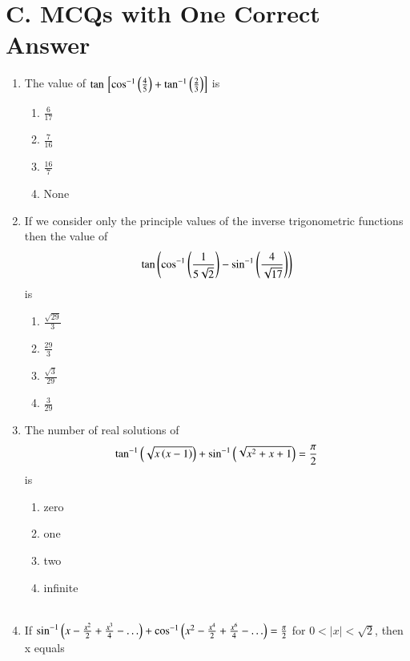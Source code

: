 \documentclass[journal,12pt,twocolumn,article]{IEEEtran}
\theoremstyle{remark}
\begin{document}
\section*{C. MCQs with One Correct Answer}
\begin{enumerate}
	\item The value of $\tan {}\left[ \cos ^{-1}\left(\frac{4}{5}\right)+\tan^{-1}\left(\frac{2}{3}\right) \right]$ is
\hfill {}
\begin{multicols}{2}
\begin{enumerate}
\item $\frac{6}{17}$
\item $\frac{7}{16}$
\columnbreak
\item $\frac{16}{7}$
\item None
\end{enumerate}
\end{multicols}
\item If we consider only the principle values of the inverse trigonometric functions then the value of 
$$\tan \left(\cos ^{-1}\left(\frac{1}{5\sqrt{2}}\right)-\sin ^{-1}\left(\frac{4}{\sqrt{17}}\right)\right)$$ is
\hfill {}
\begin{multicols}{2}
\begin{enumerate}
\item $\frac{\sqrt{29}}{3}$ 
\item $\frac{29}{3}$
\columnbreak
\item $\frac{\sqrt{3}}{29}$ 
\item $\frac{3}{29}$ 
\end{enumerate}
\end{multicols}
\item The number of real solutions of 
$$\tan ^{-1}\left(\sqrt{x\left(x-1\right)}\right)+\sin ^{-1}\left(\sqrt{x^2+x+1}\right)=\frac{\pi}{2}$$ is 
\hfill {}
\begin{multicols}{2}
\begin{enumerate}
\item zero 
\item one 
\columnbreak
\item two 
\item infinite\\\\
\end{enumerate}
\end{multicols}
\item If $\sin ^{-1}\left(x-\frac{x^2}{2}+\frac{x^3}{4}-\ldots\right)+ \cos ^{-1}\left(x^2-\frac{x^4}{2}+\frac{x^6}{4}-\ldots\right)=\frac{\pi}{2}$ for $0<|x|<\sqrt{2}$, then x equals 

\end{enumerate}
\end{document}

